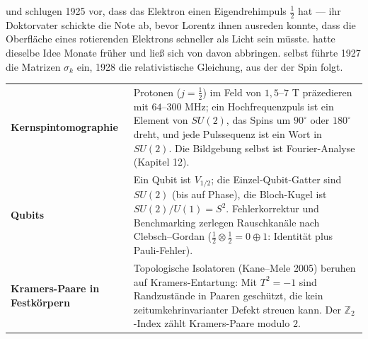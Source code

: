 \begin{geschichte}
 und  schlugen 1925 vor, dass das Elektron einen Eigendrehimpuls $\frac12$ hat --- ihr Doktorvater  schickte die Note ab, bevor Lorentz ihnen ausreden konnte, dass die Oberfläche eines rotierenden Elektrons schneller als Licht sein müsste.  hatte dieselbe Idee Monate früher und ließ sich von  davon abbringen.  selbst führte 1927 die Matrizen $\sigma_k$ ein,  1928 die relativistische Gleichung, aus der der Spin folgt.

\begin{center}
\begin{minipage}{0.9\textwidth}
\end{minipage}
\end{center}
\end{geschichte}

\begin{forschung}
\begin{center}
{\small
\renewcommand{\arraystretch}{1.45}
\begin{tabular}{@{}P{3.0cm}P{5.2cm}@{}}
\toprule
\textbf{Kernspin\-tomographie} & Protonen ($j = \frac12$) im Feld von $1{,}5$--$7$ T präzedieren mit $64$--$300$ MHz; ein Hochfrequenzpuls ist ein Element von $SU(2)$, das Spins um $90^{\circ}$ oder $180^{\circ}$ dreht, und jede Pulssequenz ist ein Wort in $SU(2)$. Die Bildgebung selbst ist Fourier-Analyse (Kapitel 12).\\
\textbf{Qubits} & Ein Qubit ist $V_{1/2}$; die Einzel-Qubit-Gatter sind $SU(2)$ (bis auf Phase), die Bloch-Kugel ist $SU(2)/U(1) = S^{2}$. Fehlerkorrektur und Benchmarking zerlegen Rauschkanäle nach Clebsch--Gordan ($\frac12\otimes\frac12 = 0\oplus1$: Identität plus Pauli-Fehler).\\
\textbf{Kramers-Paare in Festkörpern} & Topologische Isolatoren (Kane--Mele 2005) beruhen auf Kramers-Entartung: Mit $T^{2} = -1$ sind Randzustände in Paaren geschützt, die kein zeitumkehrinvarianter Defekt streuen kann. Der $\mathbb Z_2$-Index zählt Kramers-Paare modulo $2$.\\
\bottomrule
\end{tabular}}
\end{center}
\end{forschung}

